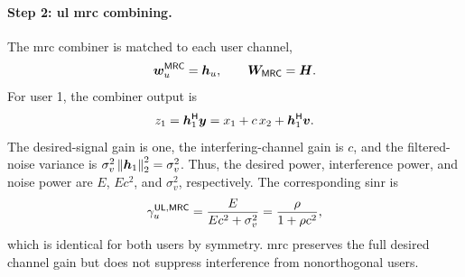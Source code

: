\paragraph{Step 2: \ac{ul} \ac{mrc} combining.}
The \ac{mrc} combiner is matched to each user channel,
\begin{equation*}
	\bm{w}_u^{\mathsf{MRC}}=\bm{h}_u,\qquad
	\bm{W}_{\mathsf{MRC}}=\bm{H}.
\end{equation*}
For user 1, the combiner output is
\begin{equation*}
	z_1={\bm{h}}^{\mathsf{H}}_1\bm{y}
	=x_1+c\,x_2+{\bm{h}}^{\mathsf{H}}_1\bm{v}.
\end{equation*}
The desired-signal gain is one, the interfering-channel gain is $c$, and the filtered-noise variance is $\sigma_v^2\left\|\bm{h}_1\right\|_2^2=\sigma_v^2$. Thus, the desired power, interference power, and noise power are $E$, $Ec^2$, and $\sigma_v^2$, respectively. The corresponding \ac{sinr} is
\begin{equation}
	\gamma_u^{\mathsf{UL},\mathsf{MRC}}
	=\frac{E}{Ec^2+\sigma_v^2}
	=\frac{\rho}{1+\rho c^2},
	\label{eq06:mu-mrc}
\end{equation}
which is identical for both users by symmetry. \ac{mrc} preserves the full desired channel gain but does not suppress interference from nonorthogonal users.

